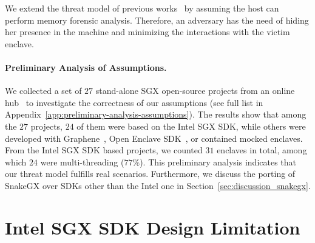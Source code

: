 We extend the threat model of previous works~\cite{biondo2018guard} 
by assuming the host can perform memory forensic analysis.
Therefore, an adversary has the need of hiding her presence in the machine 
and minimizing the interactions with the victim enclave.

\paragraph{\textbf{Preliminary Analysis of Assumptions.}}
We collected a set of $27$ stand-alone SGX open-source projects from an online 
hub~\cite{asop} to investigate the correctness of our assumptions (see full 
list in Appendix~\ref{app:preliminary-analysis-assumptions}).
The results show that among the $27$ projects, $24$ of them were based on the 
Intel SGX SDK, while others were developed with Graphene~\cite{203255}, Open 
Enclave SDK~\cite{openenclave}, or contained mocked enclaves.
From the Intel SGX SDK based projects, we counted $31$ enclaves in total, 
among which $24$ were multi-threading ($77\%$).
This preliminary analysis indicates that our threat model fulfills 
real scenarios.
Furthermore, we discuss the porting of SnakeGX over SDKs other than the Intel 
one in Section~\ref{sec:discussion_snakegx}.

\section{Intel SGX SDK Design Limitation}
\label{sec:sgx-internal}

